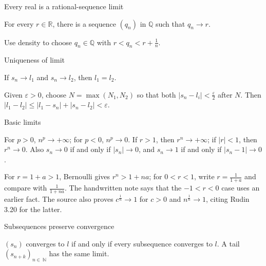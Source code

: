 \begin{theorem}{Every real is a rational-sequence limit}

For every \(r \in \mathbb{R}\), there is a sequence \(\left( q_{n} \right)\) in \(\mathbb{Q}\) such that \(q_{n}\rightarrow r\).

\end{theorem}

Use density to choose \(q_{n} \in \mathbb{Q}\) with \(r < q_{n} < r + \frac{1}{n}\).

\begin{theorem}{Uniqueness of limit}

If \(s_{n}\rightarrow l_{1}\) and \(s_{n}\rightarrow l_{2}\), then \(l_{1} = l_{2}\).

\end{theorem}

Given \(\varepsilon > 0\), choose \(N = \max\left( {N_{1},N_{2}} \right)\) so that both \(\left| {s_{n} - l_{i}} \right| < \frac{\varepsilon}{2}\) after \(N\). Then \(\left| {l_{1} - l_{2}} \right| \leq \left| {l_{1} - s_{n}} \right| + \left| {s_{n} - l_{2}} \right| < \varepsilon\).

\begin{theorem}{Basic limits}

For \(p > 0\), \(n^{p}\rightarrow + \infty\); for \(p < 0\), \(n^{p}\rightarrow 0\). If \(r > 1\), then \(r^{n}\rightarrow + \infty\); if \(|r| < 1\), then \(r^{n}\rightarrow 0\). Also \(s_{n}\rightarrow 0\) if and only if \(\left| s_{n} \right|\rightarrow 0\), and \(s_{n}\rightarrow 1\) if and only if \(\left| {s_{n} - 1} \right|\rightarrow 0\).

\end{theorem}

For \(r = 1 + a > 1\), Bernoulli gives \(r^{n} > 1 + na\); for \(0 < r < 1\), write \(r = \frac{1}{1 + a}\) and compare with \(\frac{1}{1 + na}\). The handwritten note says that the \(- 1 < r < 0\) case uses an earlier fact. The source also proves \(c^{\frac{1}{n}}\rightarrow 1\) for \(c > 0\) and \(n^{\frac{1}{n}}\rightarrow 1\), citing Rudin 3.20 for the latter.

\begin{theorem}{Subsequences preserve convergence}

\(\left( s_{n} \right)\) converges to \(l\) if and only if every subsequence converges to \(l\). A tail \(\left( s_{n + k} \right)_{n \in \ \mathbb{N}}\) has the same limit.

\end{theorem}

